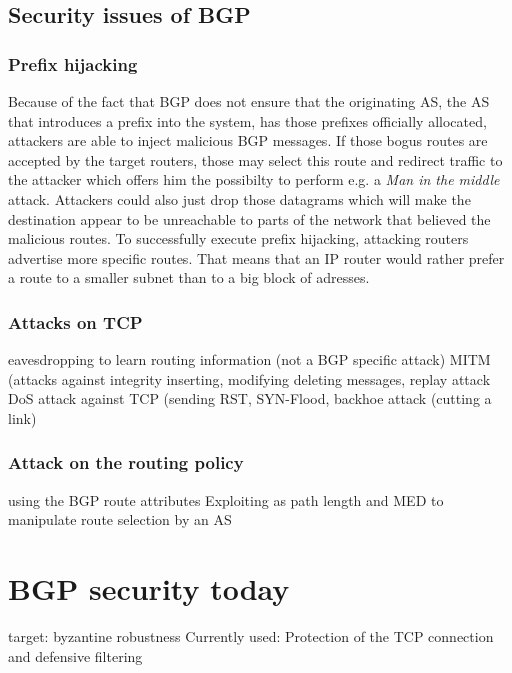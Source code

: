 \documentclass[12pt]{IEEEtran}
\begin{document}
	\subsection{Security issues of BGP}
		\subsubsection{Prefix hijacking}
		Because of the fact that BGP does not ensure that the originating AS, the AS that introduces a prefix into the system, has those prefixes officially allocated, attackers are able to inject malicious BGP messages. 
		If those bogus routes are accepted by the target routers, those may select this route and redirect traffic to the attacker which offers him the possibilty to perform e.g. a \emph{Man in the middle} attack. Attackers could also just drop those datagrams which will make the destination appear to be unreachable to parts of the network that believed the malicious routes. 
		To successfully execute prefix hijacking, attacking routers advertise more specific routes. That means that an IP router would rather prefer a route to a smaller subnet than to a big block of adresses. 
		
       	\subsubsection{Attacks on TCP}
		eavesdropping to learn routing information (not a BGP specific attack)
		MITM (attacks against integrity
			inserting, modifying deleting messages, replay attack
		DoS attack against TCP 
			(sending RST, SYN-Flood, backhoe attack (cutting a link)
		\subsubsection{Attack on the routing policy} 
			using the BGP route attributes
		Exploiting as path length and MED to manipulate route selection by an AS



       \section{BGP security today}
	target:	byzantine robustness
	Currently used: Protection of the TCP connection and defensive filtering
	
\end{document}
